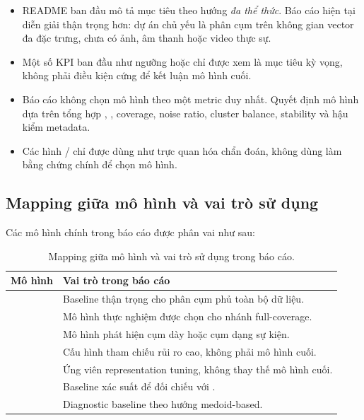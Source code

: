 \begin{itemize}
    \item README ban đầu mô tả mục tiêu theo hướng \textit{đa thể thức}. Báo cáo hiện tại diễn giải thận trọng hơn: dự án chủ yếu là phân cụm trên không gian vector đa đặc trưng, chưa có ảnh, âm thanh hoặc video thực sự.
    \item Một số KPI ban đầu như ngưỡng  hoặc  chỉ được xem là mục tiêu kỳ vọng, không phải điều kiện cứng để kết luận mô hình cuối.
    \item Báo cáo không chọn mô hình theo một metric duy nhất. Quyết định mô hình dựa trên tổng hợp , , coverage, noise ratio, cluster balance, stability và hậu kiểm metadata.
    \item Các hình / chỉ được dùng như trực quan hóa chẩn đoán, không dùng làm bằng chứng chính để chọn mô hình.
\end{itemize}

\subsection{Mapping giữa mô hình và vai trò sử dụng}

Các mô hình chính trong báo cáo được phân vai như sau:

\begin{table}[H]
\centering
\small
\caption{Mapping giữa mô hình và vai trò sử dụng trong báo cáo.}
\label{tab:appendix-model-role-mapping}
\begin{tabularx}{\textwidth}{L{0.42\textwidth} Y}
\toprule
\textbf{Mô hình} & \textbf{Vai trò trong báo cáo} \\
\midrule
{} & Baseline thận trọng cho phân cụm phủ toàn bộ dữ liệu. \\
 & Mô hình thực nghiệm được chọn cho nhánh full-coverage. \\
 & Mô hình phát hiện cụm dày hoặc cụm dạng sự kiện. \\
 & Cấu hình tham chiếu rủi ro cao, không phải mô hình cuối. \\
 & Ứng viên representation tuning, không thay thế mô hình cuối. \\
 & Baseline xác suất để đối chiếu với . \\
 & Diagnostic baseline theo hướng medoid-based. \\
\bottomrule
\end{tabularx}
\end{table}

